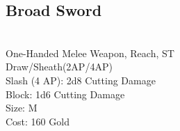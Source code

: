 \subsection{Broad Sword}\label{weapon:broadSword}\\
One-Handed Melee Weapon,  Reach, ST\\
Draw/Sheath(2AP/4AP)\\
Slash (4 AP): 2d8 Cutting Damage\\
Block: 1d6 Cutting Damage\\
Size: M\\
Cost: 160 Gold\\
